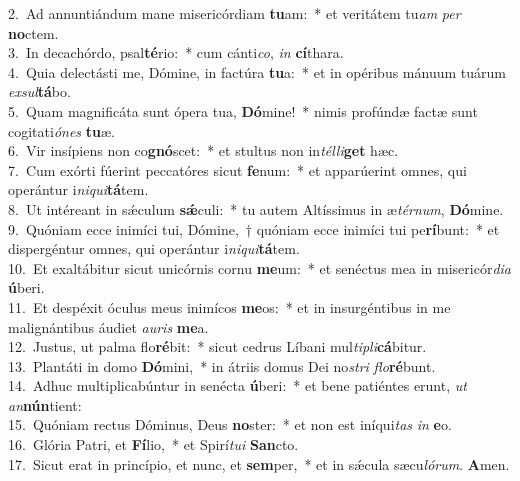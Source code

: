 {2.~}Ad annuntiándum mane misericórdiam \textbf{tu}am:~* et veritátem tu\textit{am} \textit{per} \textbf{no}ctem.\\
{3.~}In decachórdo, psal\textbf{té}rio:~* cum cánti\textit{co}, \textit{in} \textbf{cí}thara.\\
{4.~}Quia delectásti me, Dómine, in factúra \textbf{tu}a:~* et in opéribus mánuum tuárum \textit{ex}\textit{sul}\textbf{tá}bo.\\
{5.~}Quam magnificáta sunt ópera tua, \textbf{Dó}mine!~* nimis profúndæ factæ sunt cogitati\textit{ó}\textit{nes} \textbf{tu}æ.\\
{6.~}Vir insípiens non co\textbf{gnó}scet:~* et stultus non in\textit{tél}\textit{li}\textbf{get} hæc.\\
{7.~}Cum exórti fúerint peccatóres sicut \textbf{fe}num:~* et apparúerint omnes, qui operántur i\textit{ni}\textit{qui}\textbf{tá}tem.\\
{8.~}Ut intéreant in sǽculum \textbf{sǽ}culi:~* tu autem Altíssimus in æ\textit{tér}\textit{num}, \textbf{Dó}mine.\\
{9.~}Quóniam ecce inimíci tui, Dómine,~† quóniam ecce inimíci tui pe\textbf{rí}bunt:~* et dispergéntur omnes, qui operántur i\textit{ni}\textit{qui}\textbf{tá}tem.\\
{10.~}Et exaltábitur sicut unicórnis cornu \textbf{me}um:~* et senéctus mea in misericór\textit{di}\textit{a} \textbf{ú}beri.\\
{11.~}Et despéxit óculus meus inimícos \textbf{me}os:~* et in insurgéntibus in me malignántibus áudiet \textit{au}\textit{ris} \textbf{me}a.\\
{12.~}Justus, ut palma flo\textbf{ré}bit:~* sicut cedrus Líbani mul\textit{ti}\textit{pli}\textbf{cá}bitur.\\
{13.~}Plantáti in domo \textbf{Dó}mini,~* in átriis domus Dei no\textit{stri} \textit{flo}\textbf{ré}bunt.\\
{14.~}Adhuc multiplicabúntur in senécta \textbf{ú}beri:~* et bene patiéntes erunt, \textit{ut} \textit{an}\textbf{nún}tient:\\
{15.~}Quóniam rectus Dóminus, Deus \textbf{no}ster:~* et non est iníqui\textit{tas} \textit{in} \textbf{e}o.\\
{16.~}Glória Patri, et \textbf{Fí}lio,~* et Spirí\textit{tu}\textit{i} \textbf{San}cto.\\
{17.~}Sicut erat in princípio, et nunc, et \textbf{sem}per,~* et in sǽcula sæcu\textit{ló}\textit{rum}. \textbf{A}men.\\
